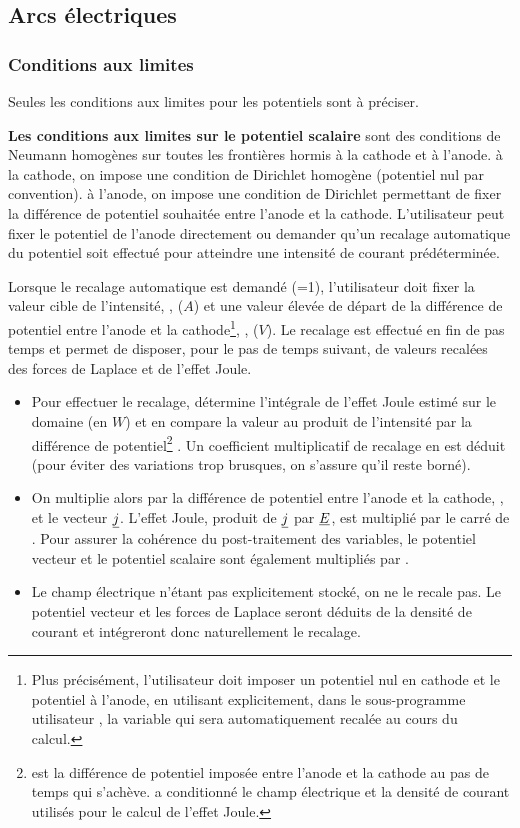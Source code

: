 \subsection*{Arcs électriques}

\subsubsection*{Conditions aux limites}

Seules les conditions aux limites pour les potentiels sont à préciser.

{\bf Les conditions aux limites sur le potentiel scalaire} sont des conditions de
Neumann homogènes sur toutes les frontières hormis à la cathode et à
l'anode. à la cathode, on impose une condition de Dirichlet homogène (potentiel nul par convention). à l'anode, on impose une
condition de Dirichlet permettant de fixer la différence de potentiel
souhaitée entre l'anode et la cathode.
L'utilisateur peut fixer le potentiel de l'anode directement ou
demander qu'un recalage automatique du potentiel soit effectué pour atteindre
une intensité de courant prédéterminée.

Lorsque le recalage automatique est demandé (=1), l'utilisateur doit fixer la
valeur cible de l'intensité, , ($A$) et une valeur élevée
de départ
de la différence de potentiel entre l'anode et la cathode\footnote{Plus précisément, l'utilisateur doit imposer un potentiel nul
en cathode et le potentiel  à l'anode, en utilisant explicitement,
dans le sous-programme utilisateur , la variable  qui
sera automatiquement recalée au cours du calcul.}, , ($V$).
Le recalage est effectué en fin de pas temps et permet de disposer, pour le pas
de temps suivant, de valeurs recalées des forces de Laplace et de l'effet
Joule.
\begin{itemize}
\item Pour effectuer le recalage, \CS détermine l'intégrale de l'effet Joule
estimé sur le domaine (en $W$) et en compare la
valeur au produit de l'intensité  par la différence de
potentiel\footnote{ est la différence de
potentiel imposée entre l'anode et la cathode au
pas de temps qui s'achève.  a conditionné le champ électrique et
la densité de courant utilisés pour le calcul de l'effet Joule.} .
Un coefficient multiplicatif de recalage  en
est déduit (pour éviter des variations trop brusques,
on s'assure qu'il reste borné). %
\item On multiplie alors par  la
différence de potentiel entre l'anode et la cathode, , et le vecteur $\underline{j}$. L'effet
Joule, produit de $\underline{j}$ par $\underline{E}$, est multiplié par
le carré de . Pour assurer la cohérence du post-traitement des
variables, le potentiel vecteur et le potentiel scalaire sont également
multipliés par .
\item Le champ électrique n'étant pas explicitement
stocké, on ne le recale pas. Le potentiel vecteur et les forces de Laplace seront déduits de la
densité de courant et intégreront donc naturellement le recalage.
\end{itemize}

